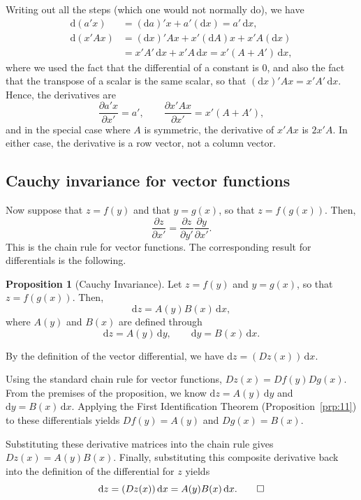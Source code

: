 \documentclass[12pt,a4paper]{article}
\makeatletter
\theoremstyle{definition}
\newtheorem{proposition}{Proposition}
\renewenvironment{proof}[1][\proofname]{\par
  \pushQED{\qed}%
  \normalfont \topsep6\p@\@plus6\p@\relax
  \trivlist
  \item[\hskip\labelsep\bfseries #1\@addpunct{.}]\ignorespaces
}{%
  \popQED\endtrivlist\@endpefalse
}
\newenvironment{solution}{%
  \begin{proof}[Solution]%
}{%
  \end{proof}%
}
\newcommand{\dd}{\mathrm{d}}
\makeatother
\begin{document}
\begin{solution}
Writing out all the steps (which one would not normally do), we have
\begin{align*}
\dd(a'x) &= (\dd a)'x + a'(\dd x) = a'\, \dd x, \\
\dd(x'Ax) &= (\dd x)'Ax + x'(\dd A)x + x'A(\dd x) \\
&= x'A'\, \dd x + x'A\, \dd x = x'(A + A')\, \dd x,
\end{align*}
where we used the fact that the differential of a constant is $0$, and also the fact that the transpose of a scalar is the same scalar, so that $(\dd x)'Ax = x'A'\, \dd x$. %
Hence, the derivatives are
\[
\frac{\partial a'x}{\partial x'} = a', \qquad
\frac{\partial x'Ax}{\partial x'} = x'(A + A'),
\]
and in the special case where $A$ is symmetric, the derivative of $x'Ax$ is $2x'A$. In either case, the derivative is a row vector, not a column vector. %
\end{solution}

\subsection{Cauchy invariance for vector functions}\label{sec:4.5}

Now suppose that $z = f(y)$ and that $y = g(x)$, so that $z = f(g(x))$. Then,
\begin{equation}\label{eq:18}
\frac{\partial z}{\partial x'} = \frac{\partial z}{\partial y'} \frac{\partial y}{\partial x'}.
\end{equation}
This is the chain rule for vector functions. The corresponding result for differentials is the following. %

\begin{proposition}[Cauchy Invariance]\label{prp:12}
Let $z = f(y)$ and $y = g(x)$, so that $z = f(g(x))$. Then,
\[
\dd z = A(y) B(x)\, \dd x,
\]
where $A(y)$ and $B(x)$ are defined through
\[
\dd z = A(y)\, \dd y, \qquad \dd y = B(x)\, \dd x.
\]
\end{proposition}

\begin{proof}
By the definition of the vector differential, we have $\dd z = (Dz(x))\, \dd x$.

Using the standard chain rule for vector functions, $Dz(x) = Df(y) Dg(x)$. From the premises of the proposition, we know $\dd z = A(y)\, \dd y$ and $\dd y = B(x)\, \dd x$. Applying the First Identification Theorem (Proposition~\ref{prp:11}) to these differentials yields $Df(y) = A(y)$ and $Dg(x) = B(x)$. 

Substituting these derivative matrices into the chain rule gives $Dz(x) = A(y) B(x)$. Finally, substituting this composite derivative back into the definition of the differential for $z$ yields
\[
\dd z = (Dz(x))\, \dd x = A(y) B(x)\, \dd x. \qedhere
\]
\end{proof}
\end{document}
